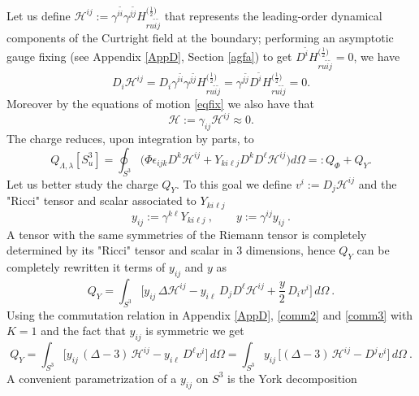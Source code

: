 \documentclass[a4paper,12pt]{article}
\begin{document}
Let us define $\mathcal{H}^{ij} := \gamma^{i\tilde{i}}\gamma^{j\tilde{j}}H^{\big(\frac{1}{2}\big)}_{ru\tilde{i}\tilde{j}}$ that represents the leading-order dynamical components of the Curtright field at the boundary; performing an asymptotic gauge fixing (see Appendix \ref{AppD}, Section \ref{agfa}) to get $D^{\tilde{i}}H^{\big(\frac{1}{2}\big)}_{ru\tilde{i}\tilde{j}}=0$, we have
\begin{equation}
D_i\mathcal{H}^{ij}=D_i\gamma^{i\tilde{i}}\gamma^{j\tilde{j}}H^{\big(\frac{1}{2}\big)}_{ru\tilde{i}\tilde{j}}=\gamma^{j\tilde{j}}D^{\tilde{i}}H^{\big(\frac{1}{2}\big)}_{ru\tilde{i}\tilde{j}}=0.
    \label{gaugefix0}
\end{equation} 
 Moreover by the equations of motion \eqref{eqfix} we also have that
\begin{equation}
    \mathcal{H}:=\gamma_{ij}\mathcal{H}^{ij} \approx 0.
    \label{trace=0}
\end{equation}
The charge reduces, upon integration by parts, to
\begin{equation}
    Q_{\Lambda, \lambda}[S^{3}_u] = \oint_{S^3} \bigg(\Phi\epsilon_{ijk}D^k\mathcal{H}^{ij} + Y_{ki\ell j}D^{k}D^{\ell}\mathcal{H}^{ij}\bigg)d\Omega=:Q_{\Phi}+Q_Y.
\end{equation}  
Let us better study the charge $Q_Y$. To this goal we define $v^{i} := D_{j}\mathcal{H}^{ij}$ and the "Ricci" tensor and scalar associated to $Y_{ki\ell j}$
\begin{equation}
y_{ij} := \gamma^{k\ell }Y_{ki\ell j} \ , \qquad y := \gamma^{ij}y_{ij} \ .
\end{equation}
A tensor with the same symmetries of the Riemann tensor is completely determined by its "Ricci" tensor and scalar in 3 dimensions, hence $Q_Y$ can be completely rewritten it terms of $y_{ij}$ and $y$ as
\begin{equation}
Q_{Y}
=
\int_{S^{3}}
\Big[
y_{ij}\,\Delta \mathcal{H}^{ij}
- y_{i\ell}\,D_{j}D^{\ell}\mathcal{H}^{ij}
+\frac{y}{2}\,D_{i}v^i
\Big]\,
d\Omega \ .
\end{equation}
Using the commutation relation in Appendix \ref{AppD}, \eqref{comm2} and \eqref{comm3} with $K=1$ and the fact that $y_{ij}$ is symmetric we get
\begin{equation}
Q_{Y}
=
\int_{S^{3}}
\Big[
y_{ij}\,(\Delta-3)\,\mathcal{H}^{ij}
- y_{i\ell}\,D^{\ell}v^{i}
\Big]\,
d\Omega=\int_{S^{3}}
y_{ij}\,
\Big[
(\Delta-3)\,\mathcal{H}^{ij}-D^{j}v^{i}
\Big]\,
d\Omega  \ .
\label{cargey}
\end{equation}
A convenient parametrization of a $y_{ij}$ on $S^{3}$ is the York decomposition
\end{document}
